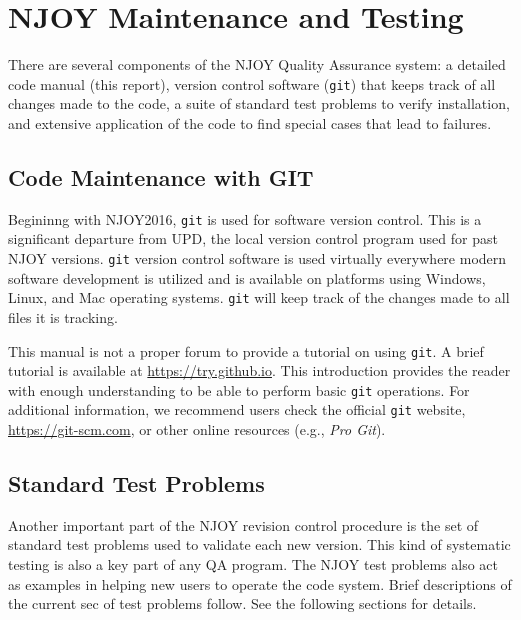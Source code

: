 \section{NJOY Maintenance and Testing}
\label{sMandT}

There are several components of the NJOY Quality Assurance
system:  a detailed code manual
(this report), version control software (\texttt{git})
 that
keeps track of all changes made to the code, a suite of standard
test problems to verify installation, and extensive application
of the code to find special cases that lead to failures.

\subsection{Code Maintenance with GIT}
\label{ssMandT_GIT}

Begininng with NJOY2016, \texttt{git} is used for software version
control. This is a significant departure from UPD\cite{UPD},
the local version control program used for past NJOY
versions.  \texttt{git} version control software is used virtually
everywhere modern software development is utilized and is available
on platforms using Windows, Linux, and Mac operating
systems. \texttt{git} will keep track of the changes made to
all files it is tracking.

This manual is not a proper forum to provide a tutorial on using
\texttt{git}. A brief tutorial is available at
\url{https://try.github.io}.  This introduction provides the reader
with enough understanding to be able to perform basic \texttt{git}
operations.  For additional information, we recommend users check the
official \texttt{git} website, \url{https://git-scm.com}, or other
online resources (e.g., \emph{Pro Git}\cite{GIT}).

\subsection{Standard Test Problems}
\label{ssMandT_testprob}

Another important part of the NJOY revision control procedure is
the set of standard test problems used to validate each new
version.  This kind of systematic testing is also a key part of
any QA program.   The
NJOY test problems also act as examples in helping new users
to operate the code system.  Brief descriptions of the current sec
of test problems follow.  See  the following sections for details.

